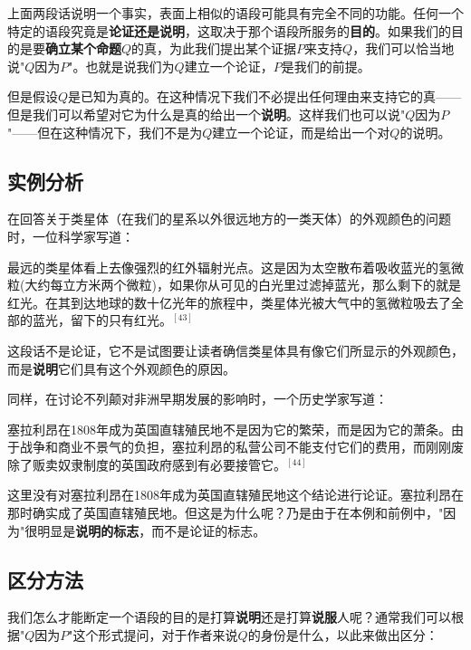 上面两段话说明一个事实，表面上相似的语段可能具有完全不同的功能。任何一个特定的语段究竟是\textbf{论证还是说明}，这取决于那个语段所服务的\textbf{目的}。如果我们的目的是要\textbf{确立某个命题}$Q$的真，为此我们提出某个证据$P$来支持$Q$，我们可以恰当地说"$Q$因为$P$"。也就是说我们为$Q$建立一个论证，$P$是我们的前提。

但是假设$Q$是已知为真的。在这种情况下我们不必提出任何理由来支持它的真——但是我们可以希望对它为什么是真的给出一个\textbf{说明}。这样我们也可以说"$Q$因为$P$"——但在这种情况下，我们不是为$Q$建立一个论证，而是给出一个对$Q$的说明。

\subsection{实例分析}

在回答关于类星体（在我们的星系以外很远地方的一类天体）的外观颜色的问题时，一位科学家写道：

\begin{displayquote}
最远的类星体看上去像强烈的红外辐射光点。这是因为太空散布着吸收蓝光的氢微粒(大约每立方米两个微粒)，如果你从可见的白光里过滤掉蓝光，那么剩下的就是红光。在其到达地球的数十亿光年的旅程中，类星体光被大气中的氢微粒吸去了全部的蓝光，留下的只有红光。$^{[43]}$
\end{displayquote}

这段话不是论证，它不是试图要让读者确信类星体具有像它们所显示的外观颜色，而是\textbf{说明}它们具有这个外观颜色的原因。

同样，在讨论不列颠对非洲早期发展的影响时，一个历史学家写道：

\begin{displayquote}
塞拉利昂在1808年成为英国直辖殖民地不是因为它的繁荣，而是因为它的萧条。由于战争和商业不景气的负担，塞拉利昂的私营公司不能支付它们的费用，而刚刚废除了贩卖奴隶制度的英国政府感到有必要接管它。$^{[44]}$
\end{displayquote}

这里没有对塞拉利昂在1808年成为英国直辖殖民地这个结论进行论证。塞拉利昂在那时确实成了英国直辖殖民地。但这是为什么呢？乃是由于在本例和前例中，"因为"很明显是\textbf{说明的标志}，而不是论证的标志。

\subsection{区分方法}

我们怎么才能断定一个语段的目的是打算\textbf{说明}还是打算\textbf{说服}人呢？通常我们可以根据"$Q$因为$P$"这个形式提问，对于作者来说$Q$的身份是什么，以此来做出区分：

